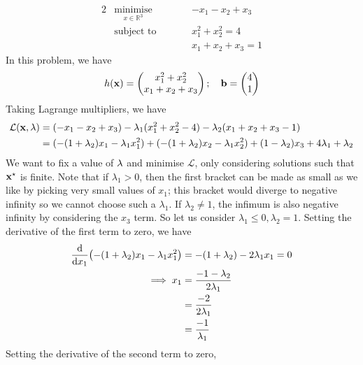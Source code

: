 \begin{example}
	\begin{alignat*}{2}
		 & \underset{x \in \mathbb R^3}{\text{minimise}} & \qquad & -x_1 -x_2 + x_3     \\
		 & \text{subject to}                             &        & x_1^2 + x_2^2 = 4   \\
		 &                                               &        & x_1 + x_2 + x_3 = 1
	\end{alignat*}
	In this problem, we have
	\[
		h(\vb x) = \begin{pmatrix}
			x_1^2 + x_2^2 \\ x_1 + x_2 + x_3
		\end{pmatrix};\quad \vb b = \begin{pmatrix}
			4 \\ 1
		\end{pmatrix}
	\]
	Taking Lagrange multipliers, we have
	\begin{align*}
		\mathcal L(\vb x, \vb\lambda) & = (-x_1 - x_2 + x_3) - \lambda_1 (x_1^2 + x_2^2 - 4) - \lambda_2(x_1+x_2 + x_3 - 1)                                               \\
		                              & = (-(1+\lambda_2) x_1 - \lambda_1 x_1^2) + (-(1 + \lambda_2)x_2 - \lambda_1 x_2^2) + (1 - \lambda_2)x_3 + 4 \lambda_1 + \lambda_2
	\end{align*}
	We want to fix a value of \(\vb \lambda\) and minimise \(\mathcal L\), only considering solutions such that \(\vb x^\star\) is finite.
	Note that if \(\lambda_1 > 0\), then the first bracket can be made as small as we like by picking very small values of \(x_1\); this bracket would diverge to negative infinity so we cannot choose such a \(\lambda_1\).
	If \(\lambda_2 \neq 1\), the infimum is also negative infinity by considering the \(x_3\) term.
	So let us consider \(\lambda_1 \leq 0, \lambda_2 = 1\).
	Setting the derivative of the first term to zero, we have
	\begin{align*}
		\dv{x_1} (-(1+\lambda_2) x_1 - \lambda_1 x_1^2) & = -(1+\lambda_2) - 2 \lambda_1 x_1 = 0 \\
		\implies x_1                                    & = \frac{-1 - \lambda_2}{2\lambda_1}    \\
		                                                & = \frac{-2}{2\lambda_1}                \\
		                                                & = \frac{-1}{\lambda_1}
	\end{align*}
	Setting the derivative of the second term to zero,

\end{example}
